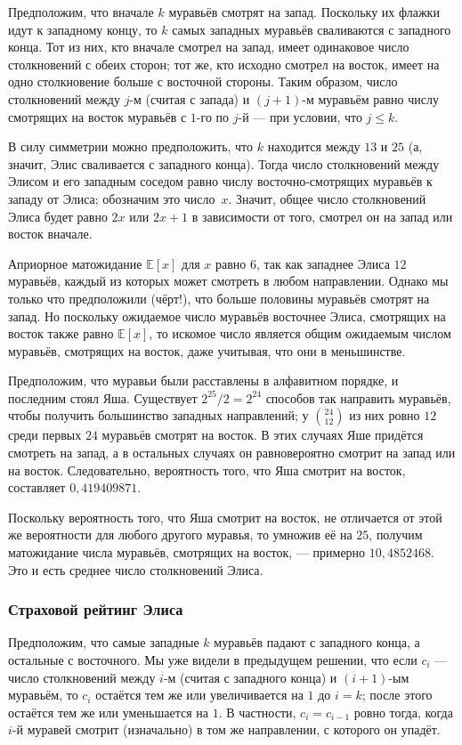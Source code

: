 Предположим, что вначале $k$ муравьёв смотрят на запад.
Поскольку их флажки идут к западному концу, то $k$ самых западных муравьёв сваливаются с западного конца.
Тот из них, кто вначале смотрел на запад, имеет одинаковое число столкновений с обеих сторон;
тот же, кто исходно смотрел на восток, имеет на одно столкновение больше с восточной стороны.
Таким образом, число столкновений между $j$-м  (считая с запада) и 
$(j+1)$-м муравьём равно числу смотрящих на восток муравьёв с $1$-го по $j$-й --- при условии, что $j\le k$.

В силу симметрии можно предположить, что $k$ находится между $13$ и $25$ (а, значит, Элис сваливается с западного конца).
Тогда число столкновений между Элисом и его западным соседом равно числу восточно-смотрящих муравьёв к западу от Элиса; обозначим это число~$x$.
Значит, общее число столкновений Элиса будет равно $2x$ или $2x+1$ в зависимости от того, смотрел он на запад или восток вначале.

Априорное матожидание $\mathbb{E}[x]$ для $x$ равно $6$, так как западнее Элиса $12$ муравьёв, каждый из которых может смотреть в любом направлении.
Однако мы только что предположили (чёрт!), что больше половины муравьёв смотрят на запад.
Но поскольку ожидаемое число муравьёв восточнее Элиса, смотрящих на восток также равно $\mathbb{E}[x]$, то искомое число является общим ожидаемым числом муравьёв, смотрящих на восток, даже учитывая, что они в меньшинстве.

Предположим, что муравьи были расставлены в алфавитном порядке, и последним стоял Яша.
Существует $2^{25}/2=2^{24}$ способов так направить муравьёв, чтобы получить большинство западных направлений; у $\binom{24}{12}$
из них ровно $12$ среди первых $24$ муравьёв смотрят на восток.
В этих случаях Яше придётся смотреть на запад,
а в остальных случаях он равновероятно смотрит на запад или на восток.
Следовательно, вероятность того, что Яша смотрит на восток, составляет
$0{,}419409871$.

Поскольку вероятность того, что Яша смотрит на восток, не отличается от этой же вероятности для любого другого муравья, то умножив её на $25$, получим матожидание числа муравьёв, смотрящих на восток, --- примерно $10{,}4852468$.
Это и есть среднее число столкновений Элиса.

\subsubsection*{Страховой рейтинг Элиса}

Предположим, что самые западные $k$ муравьёв падают с западного конца,
а остальные с восточного.
Мы уже видели в предыдущем решении, что если $c_i$ --- число столкновений между $i$-м (считая с западного конца) и $(i + 1)$-ым муравьём, то $c_i$ остаётся тем же или увеличивается на $1$ до $i = k$; после этого остаётся тем же или уменьшается на $1$.
В частности, $c_i=c_{i-1}$ ровно тогда, когда $i$-й муравей смотрит (изначально) в том же направлении, с которого он упадёт.

